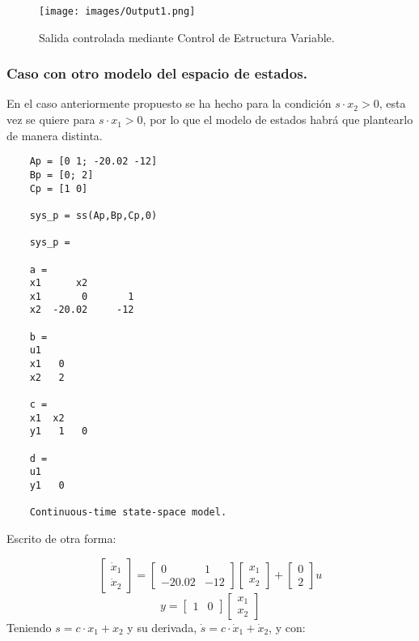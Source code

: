 \documentclass[a4paper, fontsize=11pt]{scrartcl} %
\numberwithin{equation}{section} %
\numberwithin{figure}{section} %
\numberwithin{table}{section} %
\begin{document}
	\begin{figure}[h!]
		\centering
		\texttt{[image: images/Output1.png]}
		\caption{Salida controlada mediante Control de Estructura Variable.}
		\label{Output1}
	\end{figure}
	\FloatBarrier
	
	\subsubsection{Caso con otro modelo del espacio de estados.}
	
	En el caso anteriormente propuesto se ha hecho para la condición $s \cdot x_2 > 0$, esta vez se quiere para $s \cdot x_1 > 0$, por lo que el modelo de estados habrá que plantearlo de manera distinta.\\
	
	\begin{lstlisting}
	Ap = [0 1; -20.02 -12]
	Bp = [0; 2]
	Cp = [1 0]
	
	sys_p = ss(Ap,Bp,Cp,0)
	
	sys_p =
	
	a = 
	x1      x2
	x1       0       1
	x2  -20.02     -12
	
	b = 
	u1
	x1   0
	x2   2
	
	c = 
	x1  x2
	y1   1   0
	
	d = 
	u1
	y1   0
	
	Continuous-time state-space model.
	\end{lstlisting}
	
	Escrito de otra forma:
	
	\[
	\begin{bmatrix}
		\dot{x}_1\\
		\dot{x}_2
	\end{bmatrix}
	=
	\begin{bmatrix}
		0 & 1\\
		-20.02 &   -12
	\end{bmatrix}
	\begin{bmatrix}
		x_1\\
		x_2
	\end{bmatrix}
	+
	\begin{bmatrix}
		0\\
		2
	\end{bmatrix}
	u
	\]
	\[
	y=
	\begin{bmatrix}
	1 & 0
	\end{bmatrix}
	\begin{bmatrix}
	x_1\\
	x_2
	\end{bmatrix}
	\]
	Teniendo $s = c \cdot x_1 + x_2$ y su derivada, $\dot{s} = c \cdot \dot{x}_1 + \dot{x}_2$, y con:
	
\end{document}
